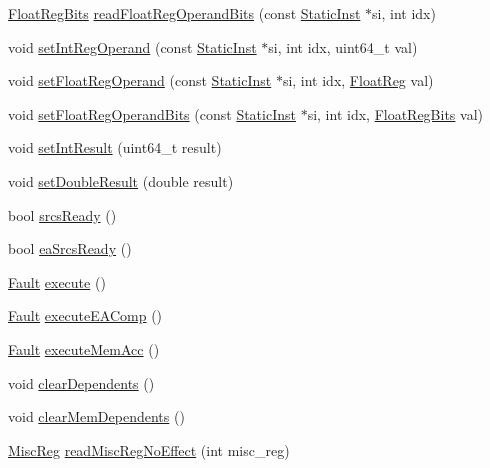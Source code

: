 \begin{DoxyCompactItemize}
\item 
\hyperlink{classOzoneDynInst_aab5eeae86499f9bfe15ef79360eccc64}{FloatRegBits} \hyperlink{classOzoneDynInst_a39d93624e4481f4a210f2c46ea6b15b0}{readFloatRegOperandBits} (const \hyperlink{classStaticInst}{StaticInst} $\ast$si, int idx)
\item 
void \hyperlink{classOzoneDynInst_a654e99f2be7cd298378462ce9651bb44}{setIntRegOperand} (const \hyperlink{classStaticInst}{StaticInst} $\ast$si, int idx, uint64\_\-t val)
\item 
void \hyperlink{classOzoneDynInst_addc8b4b6511725bf8ff48bd09ef22892}{setFloatRegOperand} (const \hyperlink{classStaticInst}{StaticInst} $\ast$si, int idx, \hyperlink{classOzoneDynInst_a75484259f1855aabc8d74c6eb1cfe186}{FloatReg} val)
\item 
void \hyperlink{classOzoneDynInst_a80a516966713c873cf964af7538dbd37}{setFloatRegOperandBits} (const \hyperlink{classStaticInst}{StaticInst} $\ast$si, int idx, \hyperlink{classOzoneDynInst_aab5eeae86499f9bfe15ef79360eccc64}{FloatRegBits} val)
\item 
void \hyperlink{classOzoneDynInst_aae8906a08187794ab88e5e140bb4c1e9}{setIntResult} (uint64\_\-t result)
\item 
void \hyperlink{classOzoneDynInst_ab7c8bc58a7b7f5d3987308e2346af4ed}{setDoubleResult} (double result)
\item 
bool \hyperlink{classOzoneDynInst_a711a83b62e4c8eb42995611093434528}{srcsReady} ()
\item 
bool \hyperlink{classOzoneDynInst_ae3a07556a5b5d8248cbfb1c99561340d}{eaSrcsReady} ()
\item 
\hyperlink{classRefCountingPtr}{Fault} \hyperlink{classOzoneDynInst_a1a8de76be7ad0985553c5bae9f26a55b}{execute} ()
\item 
\hyperlink{classRefCountingPtr}{Fault} \hyperlink{classOzoneDynInst_a336d06f2ef8e1ec90d159cb7183f3e5a}{executeEAComp} ()
\item 
\hyperlink{classRefCountingPtr}{Fault} \hyperlink{classOzoneDynInst_a7a38dfec007f2f9e9c75fbccc117b256}{executeMemAcc} ()
\item 
void \hyperlink{classOzoneDynInst_a11c8fa620d042e357345e77882547d89}{clearDependents} ()
\item 
void \hyperlink{classOzoneDynInst_a9a80912db66a6c9811bc79e97ab063f8}{clearMemDependents} ()
\item 
\hyperlink{classOzoneDynInst_aaf5f073a387db0556d1db4bcc45428bc}{MiscReg} \hyperlink{classOzoneDynInst_a1a9e07a956ef5a2611fe7cd590872097}{readMiscRegNoEffect} (int misc\_\-reg)

\end{DoxyCompactItemize}
